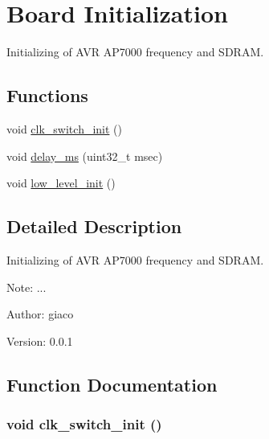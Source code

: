 \hypertarget{group___i_n_i_t}{
\section{Board Initialization}
\label{group___i_n_i_t}
}
Initializing of AVR AP7000 frequency and SDRAM.  


\subsection*{Functions}
\begin{CompactItemize}
\item 
void \hyperlink{group___i_n_i_t_gf9f36810319b49c737370f718896e171}{clk\_\-switch\_\-init} ()
\item 
void \hyperlink{group___i_n_i_t_g0a52093f3e803fcb07aeb961756c9961}{delay\_\-ms} (uint32\_\-t msec)
\item 
void \hyperlink{group___i_n_i_t_gb5cd55a9a8526924bbc0f65b024972ad}{low\_\-level\_\-init} ()
\end{CompactItemize}


\subsection{Detailed Description}
Initializing of AVR AP7000 frequency and SDRAM. 

\begin{Desc}
\item[Note:]... \end{Desc}
\begin{Desc}
\item[Author:]giaco \end{Desc}
\begin{Desc}
\item[Version:]0.0.1 \end{Desc}


\subsection{Function Documentation}
\hypertarget{group___i_n_i_t_gf9f36810319b49c737370f718896e171}{
\subsubsection[{clk\_\-switch\_\-init}]{\setlength{\rightskip}{0pt plus 5cm}void clk\_\-switch\_\-init ()}}
\label{group___i_n_i_t_gf9f36810319b49c737370f718896e171}



